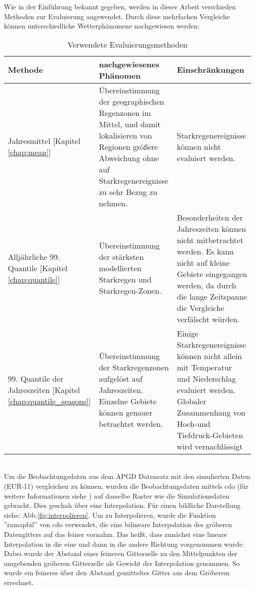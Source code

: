 Wie in der Einführung bekannt gegeben, werden in dieser Arbeit verschieden Methoden zur Evaluierung angewendet. Durch diese mehrfachen Vergleiche können unterschiedliche Wetterphänomene nachgewiesen werden:\\
\begin{table}[h!]
	\begin{tabularx}{\textwidth}{|X|X|X|}
		\hline
		\textbf{Methode} & \textbf{nachgewiesenes Phänomen}& \textbf{Einschränkungen}\\
		\hline
		Jahresmittel [Kapitel \ref{chap:mean}] & Übereinstimmung der geographischen Regenzonen im Mittel, und damit lokalisieren von Regionen größere Abweichung ohne auf Starkregenereignisse zu sehr Bezug zu nehmen. & Starkregenereignisse können nicht evaluiert werden.\\
		\hline
		Alljährliche 99. Quantile [Kapitel \ref{chap:quantile}] & Übereinstimmung der stärksten modellierten Starkregen und Starkregen-Zonen. & Besonderheiten der Jahreszeiten können nicht mitbetrachtet werden. Es kann nicht auf kleine Gebiete eingegangen werden, da durch die lange Zeitspanne die Vergleiche verfälscht würden.\\
		\hline
		99. Quantile der Jahreszeiten [Kapitel \ref{chap:quantile_seasons}] & Übereinstimmung der Starkregenzonen aufgelöst auf Jahreszeiten. Einzelne Gebiete können genauer betrachtet werden. & Einige Starkregenereignisse können nicht allein mit Temperatur und Niederschlag evaluiert werden. Globaler Zusammenhang von Hoch-und Tiefdruck-Gebieten wird vernachlässigt\\
		\hline
	\end{tabularx}
\caption{Verwendete Evaluierungsmethoden}
\end{table}
\hfill\\
Um die Beobachtungsdaten aus dem APGD\cite{meteoswiss} Datensatz mit den simulierten Daten (EUR-11) vergleichen zu können, wurden die Beobachtungsdaten mittels cdo (für weitere Informationen siehe \cite{cdo}) auf dasselbe Raster wie die Simulationsdaten gebracht. Dies geschah über eine Interpolation. Für einen bildliche Darstellung siehe: Abb.\ref{fig:interpolieren}. Um zu Interpolieren, wurde die Funktion ''ramapbil'' von cdo verwendet, die eine bilineare Interpolation des gröberen Datengitters auf das feiner vornahm. Das heißt, dass zunächst eine lineare Interpolation in die eine und dann in die andere Richtung vorgenommen wurde. Dabei wurde der Abstand einer feineren Gitterzelle zu den Mittelpunkten der umgebenden gröberen Gitterzelle als Gewicht der Interpolation genommen. So wurde ein feineres über den Abstand gemitteltes Gitter aus dem Gröberem errechnet.\\
